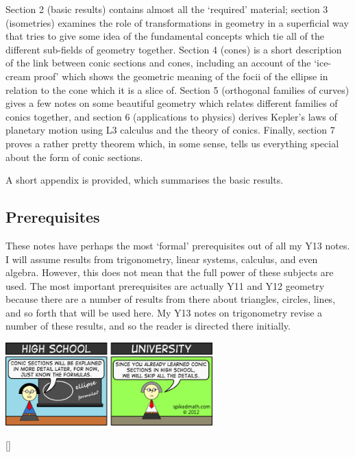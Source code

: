 \documentclass[a4paper,leqno,10pt]{article}
\theoremstyle{exercise}
\theoremstyle{plain}
\theoremstyle{definition}
\theoremstyle{remark}
\begin{document}
Section 2 (basic results) contains almost all the `required' material; section 3 (isometries) examines the role of transformations in geometry
in a superficial way that tries to give some idea of the fundamental concepts which tie all of the different sub-fields of geometry together.
Section 4 (cones) is a short description of the link between conic sections and cones, including an account of the `ice-cream proof' which shows
the geometric meaning of the focii of the ellipse in relation to the cone which it is a slice of. Section 5 (orthogonal families of curves) gives
a few notes on some beautiful geometry which relates different families of conics together, and section 6 (applications to physics) derives Kepler's
laws of planetary motion using L3 calculus and the theory of conics. Finally, section 7 proves a rather pretty theorem which, in some sense, tells
us everything special about the form of conic sections.

A short appendix is provided, which summarises the basic results.

\subsection*{Prerequisites}
These notes have perhaps the most `formal' prerequisites out of all my Y13 notes. I will assume results from trigonometry, linear systems, calculus, and
even algebra. However, this does not mean that the full power of these subjects are used. The most important prerequisites are actually Y11 and Y12
geometry because there are a number of results from there about triangles, circles, lines, and so forth that will be used here. My Y13 notes on trigonometry
revise a number of these results, and so the reader is directed there initially.

\begin{center}
  \includegraphics[width=0.6\textwidth]{conics}
\end{center}

[{\titlerule[0.8pt]}]
\let\oldsection\section
\renewcommand\section{\clearpage\oldsection}
\end{document}
